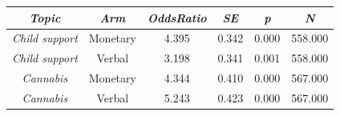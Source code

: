 \begin{tabular}{c c c c c c}
      \hline
      \textit{Topic} & \textit{Arm} & \textit{OddsRatio} & \textit{SE} & \textit{p} & \textit{N} \\
      \hline
      \textit{Child support} & Monetary & 4.395 & 0.342 & 0.000 & 558.000 \\
      \textit{Child support} & Verbal & 3.198 & 0.341 & 0.001 & 558.000 \\
      \textit{Cannabis} & Monetary & 4.344 & 0.410 & 0.000 & 567.000 \\
      \textit{Cannabis} & Verbal & 5.243 & 0.423 & 0.000 & 567.000 \\
      \hline
    \end{tabular}